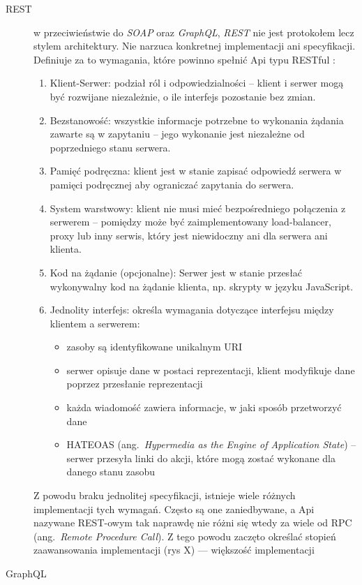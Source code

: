 \begin{description}
			\item[REST] w przeciwieństwie do \emph{SOAP} oraz \emph{GraphQL}, \emph{REST} nie jest protokołem lecz stylem architektury.
				Nie narzuca konkretnej implementacji ani specyfikacji. Definiuje za to wymagania, które powinno spełnić Api typu RESTful \cite{RESTful}:
				\begin{enumerate}
					\item Klient-Serwer: podział ról i odpowiedzialności -- klient i serwer mogą być rozwijane niezależnie, o ile interfejs pozostanie bez zmian.
					\item Bezstanowość: wszystkie informacje potrzebne to wykonania żądania zawarte są w zapytaniu -- jego wykonanie jest niezależne od poprzedniego stanu serwera.
					\item Pamięć podręczna: klient jest w stanie zapisać odpowiedź serwera w pamięci podręcznej aby ograniczać zapytania do serwera.
					\item System warstwowy: klient nie musi mieć bezpośredniego połączenia z serwerem
						-- pomiędzy może być zaimplementowany load-balancer, proxy lub inny serwis, który jest niewidoczny ani dla serwera ani klienta.
					\item Kod na żądanie (opcjonalne): Serwer jest w stanie przesłać wykonywalny kod na żądanie klienta, np. skrypty w języku JavaScript.
					\item Jednolity interfejs: określa wymagania dotyczące interfejsu między klientem a serwerem:
						\begin{itemize}
							\item zasoby są identyfikowane unikalnym URI
							\item serwer opisuje dane w postaci reprezentacji, klient modyfikuje dane poprzez przesłanie reprezentacji
							\item każda wiadomość zawiera informacje, w jaki sposób przetworzyć dane
							\item HATEOAS (ang.\ \emph{Hypermedia as the Engine of Application State})
								-- serwer przesyła linki do akcji, które mogą zostać wykonane dla danego stanu zasobu
						\end{itemize}
				\end{enumerate}

				Z powodu braku jednolitej specyfikacji, istnieje wiele różnych implementacji tych wymagań.
				Często są one zaniedbywane, a Api nazywane REST-owym tak naprawdę nie różni się wtedy za wiele od RPC (ang.\ \emph{Remote Procedure Call}).
				Z tego powodu zaczęto określać stopień zaawansowania implementacji (rys X) --- większość implementacji 




			\item[GraphQL] 
		\end{description}

